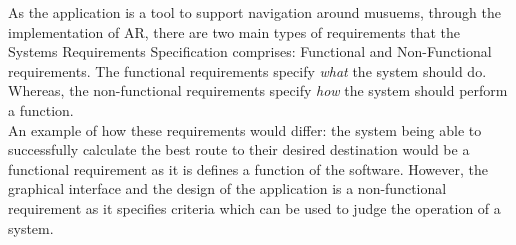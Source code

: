 

As the application is a tool to support navigation around musuems, through the implementation of AR, there are two main types of requirements that the Systems Requirements Specification comprises: Functional and Non-Functional requirements. The functional requirements specify \textit{what} the system should do. Whereas, the non-functional requirements specify \textit{how} the system should perform a function.\\

An example of how these requirements would differ: the system being able to successfully calculate the best route to their desired destination would be a functional requirement as it is defines a function of the software. However, the graphical interface and the design of the application is a non-functional requirement as it specifies criteria which can be used to judge the operation of a system.

